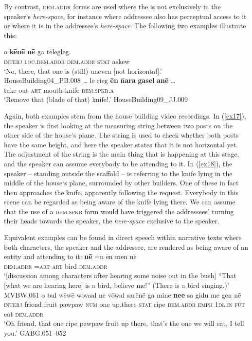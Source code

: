 \documentclass[output=paper
,modfonts
,nonflat]{langsci/langscibook}
\begin{document}
By contrast, \textsc{dem.addr} forms are used where the  is not exclusively in the speaker's \textit{here-space}, for instance where addressee also has perceptual access to it or where it is in the addressee's \textit{here-space}. The following two examples illustrate this:
 
\ea	\label{ex17}
\gll 	o			\textbf{k\=en\=e} 			\textbf{n\=e} 	ga 	t\=el\=egl\=eg.		\\
\textsc{interj}	\textsc{loc.dem.addr}	\textsc{dem.addr}	\textsc{stat}	askew			\\
\glt	`No, there, that one is (still) uneven [not horizontal].'\\ \hfill{HouseBuilding04\_PB.008}
\z
\ea	\label{ex18}
\gll		{\ob}\dots{\cb}	le		rieg	\textbf{\=en}		\textbf{\=nara}		\textbf{gasel}		\textbf{an\=e}		{\ob}\dots{\cb}		\\
				{}	take	out	\textsc{art}	mouth	knife	\textsc{\textsc{dem.spkr.a}}	\\
\glt	`Remove that (blade of that) knife!.'							\hfill{HouseBuilding09\_JJ.009}
\z

\noindent
Again, both examples stem from the house building video recordings. In (\ref{ex17}), the speaker is first looking at the measuring string between two posts on the other side of the house's plane. The string is used to check whether both posts have the same height, and here the speaker states that it is not horizontal yet. The adjustment of the string is the main thing that is happening at this stage, and the speaker can assume everybody to be attending to it. In (\ref{ex18}), the speaker -- standing outside the scaffold -- is referring to the knife lying in the middle of the house`s plane, surrounded by other builders. One of these in fact then approaches the knife, apparently following the request. Everybody in this scene can be regarded as being aware of the knife lying there. We can assume that the use of a \textsc{dem.spkr} form would have triggered the addressees' turning their heads towards the speaker, the \textit{here-space} exclusive to the speaker.

Equivalent examples can be found in direct speech within narrative texts where both characters, the speaker and the addressee, are rendered as being aware of an entity and attending to it:
\ea	\label{ex19}
\gll		\textbf{n\=e}		=n		\=en		men	n\=e		\\
\textsc{dem.addr}	\textsc{=art}	\textsc{art}	bird	\textsc{dem.addr}		\\
\glt	`[discussion among characters after hearing some noise out in the bush] ``That [what we are hearing here] is a bird, believe me!'' (There is a bird singing.)'				\hfill{MVBW.061}
\z
\ea \label{ex20}
\gll		o 		bul	w\=ew\=e	wova{\textquotesingle}al	ne		v\=owal 	sar\=en\=e 	ga 	mine	\textbf{ne{\textquotesingle}\=e} 	sa		gidu		me	gen	n\=e	\\
\textsc{interj}	friend	fruit	pawpaw	\textsc{num}	one		up.there	\textsc{stat}	ripe		\textsc{dem.addr}	\textsc{emph}	\textsc{1dl.in}	\textsc{fut}	eat		\textsc{dem.addr}		\\
\glt	`Oh friend, that one ripe pawpaw fruit up there, that's the one we will eat, I tell you.'	\hfill{GABG.051--052}
\z
\end{document}

